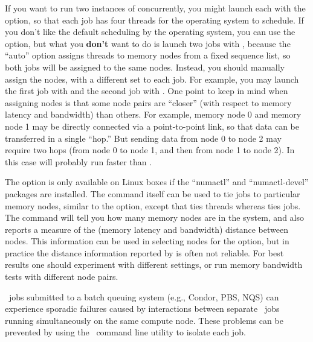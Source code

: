 If you want to run two instances of  concurrently, you might
launch each with the  option, so that each job has four
threads for the operating system to schedule.  If you don't like the
default scheduling by the operating system, you can use the
 option, but what you \textbf{don't} want to do is launch
two jobs with , because the ``auto'' option assigns
threads to memory nodes from a fixed sequence list, so both jobs will be
assigned to the same nodes.  Instead, you should manually assign the
nodes, with a different set to each job.  For example, you may launch
the first job with  and the second job with
.  One point to keep in mind when assigning nodes is
that some node pairs are ``closer'' (with respect to memory latency and
bandwidth) than others.  For example, memory node 0 and memory node 1
may be directly connected via a point-to-point link, so that data can be
transferred in a single ``hop.''  But sending data from node 0 to node 2
may require two hops (from node 0 to node 1, and then from node 1 to
node 2).  In this case  will probably run faster than
.

The  option is only available on Linux boxes if the
``numactl'' and ``numactl-devel'' packages are installed.  The
 command itself can be used to tie jobs to particular memory
nodes, similar to the  option, except that
 ties threads whereas  ties jobs.  The
 command will tell you how many memory nodes are
in the system, and also reports a measure of the (memory latency and
bandwidth) distance between nodes.  This information can be used in
selecting nodes for the  option, but in
practice the distance information reported by  is often not
reliable.  For best results one should experiment with different
settings, or run memory bandwidth tests with different node
pairs.

\OOMMF\ jobs submitted to a batch queuing system (e.g., Condor, PBS,
NQS) can experience sporadic failures caused by interactions between
separate \OOMMF\ jobs running simultaneously on the same compute
node.  These problems can be prevented by using the \OOMMF\ command
line utility
to isolate each job.

